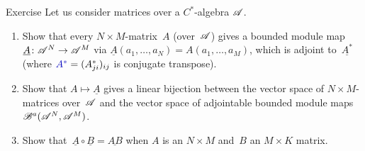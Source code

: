 \documentclass[a]{subfiles}
\begin{document}
\begin{parsec}
	\begin{point}{Exercise}%
Let us consider matrices over a $C^*$-algebra $\mathscr{A}$.
\begin{enumerate}
\item
	Show that every $N\times M$-matrix~$A$ (over~$\mathscr{A}$)
gives a bounded module map~$\underline{A}\colon \mathscr{A}^N\to\mathscr{A}^M$ 
via $\underline{A}(a_1,\dotsc,a_N)= A(a_1,\dotsc,a_M)$,
which is adjoint to~$\underline{A^*}$
(where $\Define{A^*}= (A_{ji}^*)_{ij}$ is conjugate transpose).

\item
Show that $A\mapsto \underline{A}$
gives a linear bijection between the vector 
space of $N\times M$-matrices 
over~$\mathscr{A}$ and the vector space of adjointable bounded
module maps~$\mathscr{B}^a(\mathscr{A}^N,\mathscr{A}^M)$.

\item
Show that~$\underline{A}\circ \underline{B} = \underline{AB}$
when $A$ is an $N\times M$ and~$B$ an $M\times K$ matrix.


\end{enumerate}
\end{point}
\end{parsec}
\end{document}
